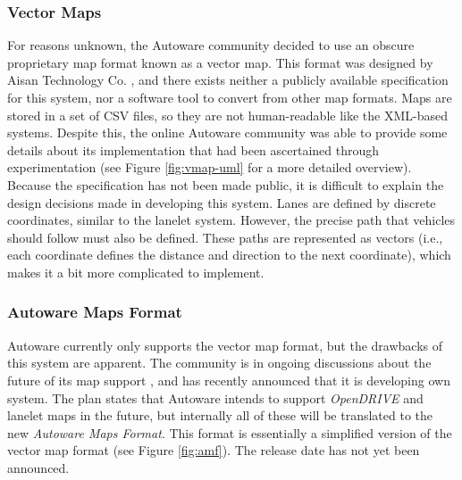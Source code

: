 \documentclass[12pt,twoside]{article}
\begin{document}
\subsubsection{Vector Maps}
For reasons unknown, the Autoware community decided to use an obscure proprietary map format known as a vector map. This format was designed by Aisan Technology Co. \cite{Aisan}, and there exists neither a publicly available specification for this system, nor a software tool to convert from other map formats. Maps are stored in a set of CSV files, so they are not human-readable like the XML-based systems. Despite this, the online Autoware community was able to provide some details about its implementation that had been ascertained through experimentation (see Figure \ref{fig:vmap-uml} for a more detailed overview). Because the specification has not been made public, it is difficult to explain the design decisions made in developing this system. Lanes are defined by discrete coordinates, similar to the lanelet system. However, the precise path that vehicles should follow must also be defined. These paths are represented as vectors (i.e., each coordinate defines the distance and direction to the next coordinate), which makes it a bit more complicated to implement.

\subsubsection{Autoware Maps Format}
Autoware currently only supports the vector map format, but the drawbacks of this system are apparent. The community is in ongoing discussions about the future of its map support \cite{AutowareMaps1}, and has recently announced that it is developing own system. The plan \cite{AutowareMaps2} states that Autoware intends to support \textit{OpenDRIVE} and lanelet maps in the future, but internally all of these will be translated to the new \textit{Autoware Maps Format}. This format is essentially a simplified version of the vector map format (see Figure \ref{fig:amf}). The release date has not yet been announced.
\end{document}
